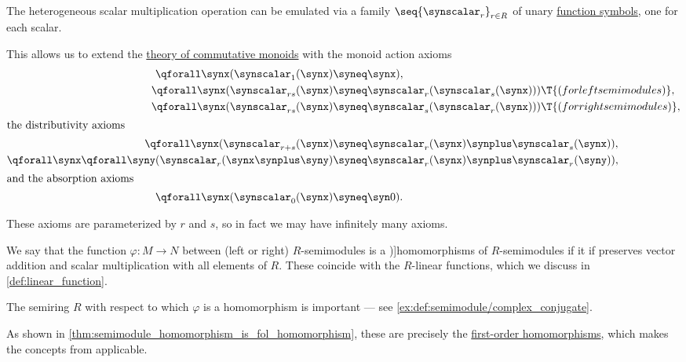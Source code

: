 \begin{definition}
\begin{thmenum}[resume=def:semimodule]
    The heterogeneous scalar multiplication operation can be emulated via a family \( \seq{ \synscalar_r }_{r \in R} \) of unary \hyperref[def:fol_signature/function]{function symbols}, one for each scalar.

    This allows us to extend the \hyperref[def:additive_semigroup/theory]{theory of commutative monoids} with the monoid action axioms
    \begin{align}
      \qforall \synx (\synscalar_1(\synx) &\syneq \synx), \label{eq:def:semimodule/theory/identity} \\
      \qforall \synx (\synscalar_{rs}(\synx) &\syneq \synscalar_r(\synscalar_s(\synx))) \T{(for left semimodules)},  \label{eq:def:semimodule/theory/compatibility} \\
      \qforall \synx (\synscalar_{rs}(\synx) &\syneq \synscalar_s(\synscalar_r(\synx))) \T{(for right semimodules)}, \label{eq:def:semimodule/theory/right_compatibility} \\
    \intertext{the distributivity axioms}
      \qforall \synx (\synscalar_{r + s}(\synx) &\syneq \synscalar_r(\synx) \synplus \synscalar_s(\synx)),                         \label{eq:def:semimodule/theory/distributivity/scalar} \\
      \qforall \synx \qforall \syny (\synscalar_r(\synx \synplus \syny) &\syneq \synscalar_r(\synx) \synplus \synscalar_r(\syny)), \label{eq:def:semimodule/theory/distributivity/vector} \\
    \intertext{and the absorption axioms}
      \qforall \synx (\synscalar_0(\synx) &\syneq \syn0). \label{eq:def:semimodule/theory/absorption}
    \end{align}

    These axioms are parameterized by \( r \) and \( s \), so in fact we may have infinitely many axioms.

     We say that the function \( \varphi: M \to N \) between (left or right) \( R \)-semimodules is a \term[en=\( R \)-homomorphism (\cite[156]{Golan1999Semirings})]{homomorphisms of \( R \)-semimodules} if it if preserves vector addition and scalar multiplication with all elements of \( R \). These coincide with the \( R \)-linear functions, which we discuss in \cref{def:linear_function}.

    The semiring \( R \) with respect to which \( \varphi \) is a homomorphism is important --- see \cref{ex:def:semimodule/complex_conjugate}.

    As shown in \cref{thm:semimodule_homomorphism_is_fol_homomorphism}, these are precisely the \hyperref[def:fol_homomorphism]{first-order homomorphisms}, which makes the concepts from  applicable.


\end{thmenum}
\end{definition}
